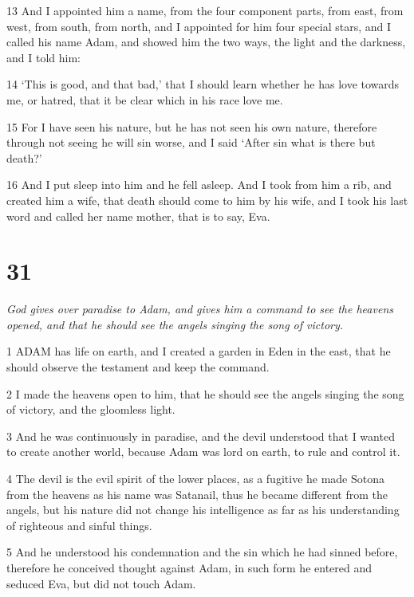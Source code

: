 \par 13 And I appointed him a name, from the four component parts, from east, from west, from south, from north, and I appointed for him four special stars, and I called his name Adam, and showed him the two ways, the light and the darkness, and I told him:

\par 14 ‘This is good, and that bad,’ that I should learn whether he has love towards me, or hatred, that it be clear which in his race love me.

\par 15 For I have seen his nature, but he has not seen his own nature, therefore through not seeing he will sin worse, and I said ‘After sin what is there but death?’

\par 16 And I put sleep into him and he fell asleep. And I took from him a rib, and created him a wife, that death should come to him by his wife, and I took his last word and called her name mother, that is to say, Eva.

\chapter{31}

\par \textit{God gives over paradise to Adam, and gives him a command to see the heavens opened, and that he should see the angels singing the song of victory.}

\par 1 ADAM has life on earth, and I created a garden in Eden in the east, that he should observe the testament and keep the command.

\par 2 I made the heavens open to him, that he should see the angels singing the song of victory, and the gloomless light.

\par 3 And he was continuously in paradise, and the devil understood that I wanted to create another world, because Adam was lord on earth, to rule and control it.

\par 4 The devil is the evil spirit of the lower places, as a fugitive he made Sotona from the heavens as his name was Satanail, thus he became different from the angels, but his nature did not change his intelligence as far as his understanding of righteous and sinful things.

\par 5 And he understood his condemnation and the sin which he had sinned before, therefore he conceived thought against Adam, in such form he entered and seduced Eva, but did not touch Adam.

